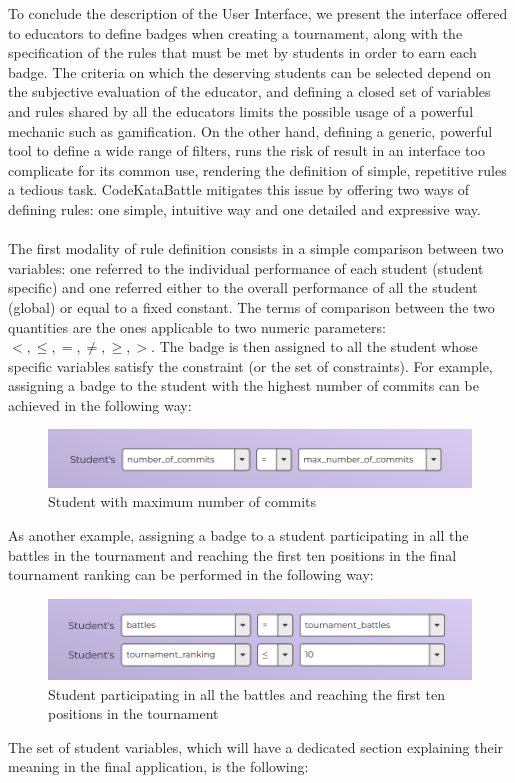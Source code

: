 To conclude the description of the User Interface, we present the interface offered to educators to define badges when creating a tournament, along with the specification of the rules that must be met by students in order to earn each badge. The criteria on which the deserving students can be selected depend on the subjective evaluation of the educator, and defining a closed set of variables and rules shared by all the educators limits the possible usage of a powerful mechanic such as gamification. On the other hand, defining a generic, powerful tool to define a wide range of filters, runs the risk of result in an interface too complicate for its common use, rendering the definition of simple, repetitive rules a tedious task. CodeKataBattle mitigates this issue by offering two ways of defining rules: one simple, intuitive way and one detailed and expressive way.\\
\\
The first modality of rule definition consists in a simple comparison between two variables: one referred to the individual performance of each student (student specific) and one referred either to the overall performance of all the student (global) or equal to a fixed constant. The terms of comparison between the two quantities are the ones applicable to two numeric parameters: $<,\leq,=,\neq,\geq,>$. The badge is then assigned to all the student whose specific variables satisfy the constraint (or the set of constraints). For example, assigning a badge to the student with the highest number of commits can be achieved in the following way:
\begin{figure}[H]
    \centering
    \includegraphics[width=0.9\linewidth]{Images/UI_Badge_form1.png}
    \caption{Student with maximum number of commits}
    \label{fig:UI_form1}
\end{figure}
As another example, assigning a badge to a student participating in all the battles in the tournament and reaching the first ten positions in the final tournament ranking can be performed in the following way:
\begin{figure}[H]
    \centering
    \includegraphics[width=0.9\linewidth]{Images/UI_Badge_form2.png}
    \caption{Student participating in all the battles and reaching the first ten positions in the tournament}
    \label{fig:UI_form2}
\end{figure}
The set of student variables, which will have a dedicated section explaining their meaning in the final application, is the following:

